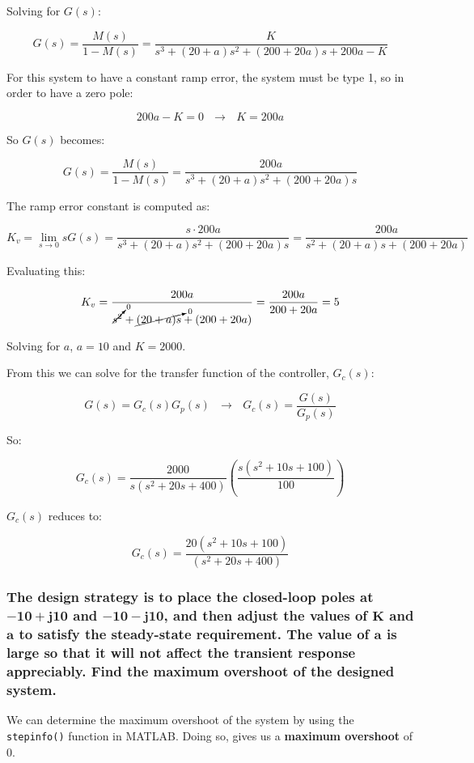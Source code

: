 \documentclass[12pt, letterpaper]{../assignment}
\begin{document}
Solving for $G(s)$:

$$ G(s) = \frac{M(s)}{1-M(s)} =  \frac{K}{s^3 + (20 + a)s^2 + (200 + 20a)s + 200a  - K} $$

For this system to have a constant ramp error, the system must be type 1,
so in order to have a zero pole:

$$ 200 a - K = 0 \ \ \ \rightarrow \ \ \ K = 200 a $$

So $G(s)$ becomes:

$$ G(s) = \frac{M(s)}{1-M(s)} =  \frac{200a}{s^3 + (20 + a)s^2 + (200 + 20a)s} $$

The ramp error constant is computed as:

$$ K_v = \lim_{s \to 0} s G(s) = \frac{s \cdot 200a}{s^3 + (20 + a)s^2 + (200 + 20a)s} = \frac{200a}{s^2 + (20 + a)s + (200 + 20a)} $$

Evaluating this:

$$ K_v = \frac{200a}{\cancelto{0}{s^2} + \cancelto{0}{(20 + a)s} + (200 + 20a)} = \frac{200a}{200 + 20a} = 5 $$

\begin{answer}
Solving for $a$, $a = 10$ and $K = 2000$.
\end{answer}


From this we can solve for the transfer function of the controller, $G_c(s)$:

$$ G(s) = G_c(s) G_p(s) \ \ \ \rightarrow \ \ \ G_c(s) = \frac{G(s)}{G_p(s)} $$

So:

$$ G_c(s) = \frac{2000}{s(s^2 + 20s + 400)}
     \left( \frac{s(s^2 + 10s + 100)}{100} \right)$$

$G_c(s)$ reduces to:

\begin{answer}
$$ G_c(s) = \frac{20(s^2 + 10s + 100)}{(s^2 + 20s + 400)} $$
\end{answer}

\subsubsection*{The design strategy is to place the closed-loop poles at $\mathbf{- 10 + j10}$ and $\mathbf{-10 - j10}$,
and then adjust the values of $\mathbf{K}$ and $\mathbf{a}$ to satisfy the steady-state requirement.
The value of $\mathbf{a}$ is large so that it will not affect the transient response appreciably.
Find the maximum overshoot of the designed system.}

\begin{answer}
We can determine the maximum overshoot of the system by using the \texttt{stepinfo()} function in MATLAB.
Doing so, gives us a \textbf{maximum overshoot} of $0$.
\end{answer}
\end{document}
